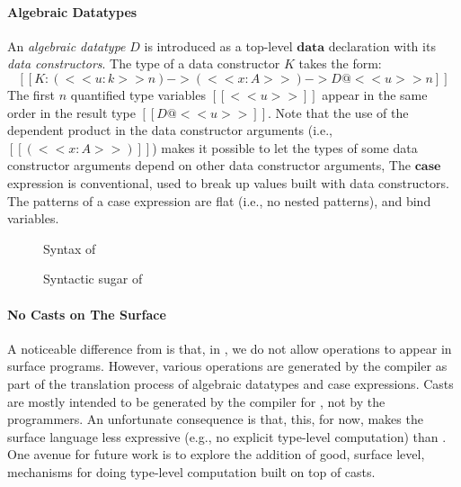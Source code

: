 \paragraph{Algebraic Datatypes}
An \emph{algebraic datatype} $D$ is introduced as a top-level
$\mathbf{data}$ declaration with its \emph{data constructors}. The type
of a data constructor $K$ takes the form:
\[
[[K : (<<u:k>>n) -> (<<x : A>>) -> D@<<u>>n]]
\]
The first $n$ quantified type variables $[[<<u>>]]$ appear in the same
order in the result type $[[D@<<u>>]]$.  Note that the use of the
dependent product in the data constructor arguments (i.e.,
$[[(<<x:A>>)]]$) makes it possible to let the types of some data
constructor arguments depend on other data constructor arguments,
The $\mathbf{case}$ expression is conventional, used to break up values
built with data constructors.  The patterns of a case expression are
flat (i.e., no nested patterns), and bind variables.

{
\renewcommand{\arraystretch}{0.9}
\begin{figure}
\resizebox{\columnwidth}{!}{\gram{\ottpgm\ottinterrule
\ottdecl\ottinterrule
\ottu\ottinterrule
\ottp\ottinterrule
\ottE\ottinterrule
\ottGs}}
\caption{Syntax of \sufcc}
\label{fig:surface:syntax}
\end{figure}

\begin{figure}
\resizebox{\columnwidth}{!}{$\ottsurfsugar$} %
\caption{Syntactic sugar of \sufcc}
\label{fig:surface:sugar}
\end{figure}
}

\paragraph{No Casts on The Surface}
A noticeable difference from \name is that, in \sufcc, we do not allow
\cast operations to appear in surface programs. However, various \cast
operations are generated by the compiler as part of the translation
process of algebraic datatypes and case expressions. 
Casts are mostly intended to be generated by the compiler for \sufcc, not
by the programmers. An unfortunate consequence is that, this, for now,
makes the surface language less expressive (e.g., no explicit
type-level computation) than \name. One avenue for future work is to
explore the addition of good, surface level, mechanisms for doing
type-level computation built on top of casts.


